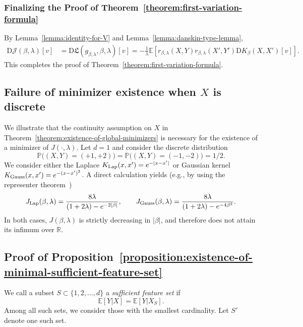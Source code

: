 \documentclass[sn-mathphys-num]{sn-jnl}%
\numberwithin{equation}{section}
\newcommand{\R}{\mathbb{R}}
\newcommand{\E}{\mathbb{E}}
\newcommand{\kernel}{K}
\renewcommand{\P}{\mathbb{P}}
\theoremstyle{thmstyleone}%
\theoremstyle{thmstyletwo}%
\theoremstyle{thmstylethree}%
\begin{document}
\subsubsection{Finalizing the Proof of Theorem~\ref{theorem:first-variation-formula}} 
By Lemma~\ref{lemma:identity-for-V} and Lemma~\ref{lemma:danskin-type-lemma}, 
\begin{equation*}
\begin{split} 
	\mathrm{D}\mathcal{J}(\beta,\lambda)[v] 
		&= \mathrm{D} \mathfrak{L}(g_{\beta, \lambda}, \beta, \lambda)[v] = - \frac{1}{\lambda} \E[r_{\beta, \lambda}(X, Y) r_{\beta, \lambda}(X', Y') \mathrm{D} \kernel_\beta(X, X')[v]]. 
\end{split} 
\end{equation*} 
This completes the proof of Theorem~\ref{theorem:first-variation-formula}. 



\subsection{Failure of minimizer existence when $X$ is discrete}
\label{sec:discrete-counterexample}
\indent\indent
We illustrate that the continuity assumption on $X$ in Theorem~\ref{theorem:existence-of-global-minimizers} is necessary for the existence of a minimizer of $J(\cdot,\lambda)$.
Let $d=1$ and consider the discrete distribution
\[
\P\big((X,Y)=(+1,+2)\big)
=
\P\big((X,Y)=(-1,-2)\big)
=
1/2.
\]
We consider either the Laplace $K_{{\rm Lap}}(x, x') = e^{-|x-x'|}$ or Gaussian kernel $K_{{\rm Gauss}}(x,x')=e^{-(x-x')^2}$.
A direct calculation yields (e.g., by using the representer theorem~\cite{Bach24})
\[
J_{{\rm Lap}}(\beta,\lambda) = 
\frac{8\lambda}{(1+2\lambda)-e^{-2|\beta|}}, \qquad 
J_{{\rm Gauss}}(\beta,\lambda) = 
\frac{8\lambda}{(1+2\lambda)-e^{-4\beta^2}}.
\]
In both cases, $J(\beta, \lambda)$ is strictly decreasing in $|\beta|$, and therefore does not attain its infimum over $\R$.



\subsection{Proof of Proposition~\ref{proposition:existence-of-minimal-sufficient-feature-set}}
\label{sec:proof-of-proposition-existence-of-minimal-sufficient-feature-set}
We call a subset $S \subset \{1, 2, \ldots, d\}$ a \emph{sufficient feature set} if 
\begin{equation*}
	\E[Y|X] = \E[Y|X_S]. 
\end{equation*}
Among all such sets, we consider those with the smallest cardinality. Let $S'$ denote one such set.
\end{document}
